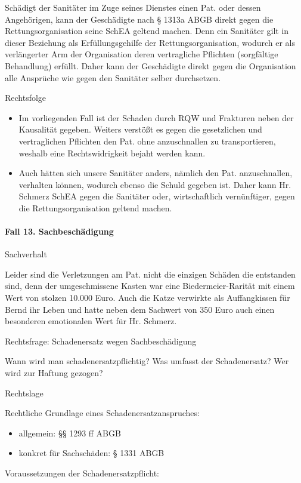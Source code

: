 \documentclass{article}
\begin{document}
Sch\"adigt der Sanit\"ater im Zuge seines Dienstes einen Pat. oder
dessen Angeh\"origen, kann der Gesch\"adigte nach {\S} 1313a ABGB
direkt gegen die Rettungsorganisation seine SchEA geltend machen. Denn
ein Sanit\"ater gilt in dieser Beziehung als Erf\"ullungsgehilfe der
Rettungsorganisation, wodurch er als verl\"angerter Arm der
Organisation deren vertragliche Pflichten (sorgf\"altige Behandlung)
erf\"ullt. Daher kann der Gesch\"adigte direkt gegen die Organisation
alle Anspr\"uche wie gegen den Sanit\"ater selber durchsetzen.

Rechtsfolge

\begin{itemize}
\item Im vorliegenden Fall ist der Schaden durch RQW und Frakturen neben
der Kausalit\"at gegeben. Weiters verst\"o{\ss}t es gegen die
gesetzlichen und vertraglichen Pflichten den Pat. ohne anzuschnallen zu
transportieren, weshalb eine Rechtswidrigkeit bejaht werden kann. 

\item Auch h\"atten sich unsere Sanit\"ater anders, n\"amlich den Pat.
anzuschnallen, verhalten k\"onnen, wodurch ebenso die Schuld gegeben
ist. Daher kann Hr. Schmerz SchEA gegen die Sanit\"ater oder,
wirtschaftlich vern\"unftiger, gegen die Rettungsorganisation geltend
machen.

\end{itemize}
\paragraph{Fall 13. Sachbesch\"adigung}
Sachverhalt

Leider sind die Verletzungen am Pat. nicht die einzigen Sch\"aden die
entstanden sind, denn der umgeschmissene Kasten war eine
Biedermeier-Rarit\"at mit einem Wert von stolzen 10.000 Euro. Auch die
Katze verwirkte als Auffangkissen f\"ur Bernd ihr Leben und hatte neben
dem Sachwert von 350 Euro auch einen besonderen emotionalen Wert f\"ur
Hr. Schmerz.

Rechtsfrage: Schadenersatz wegen Sachbesch\"adigung

Wann wird man schadenersatzpflichtig? Was umfasst der Schadenersatz? Wer
wird zur Haftung gezogen?

Rechtslage

Rechtliche Grundlage eines Schadenersatzanspruches:

\begin{itemize}
\item allgemein: {\S}{\S} 1293 ff ABGB

\item konkret f\"ur Sachsch\"aden: {\S} 1331 ABGB

\end{itemize}
Voraussetzungen der Schadenersatzpflicht:
\end{document}
